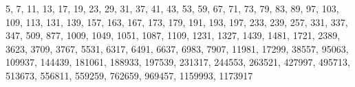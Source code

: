 5, 7, 11, 13, 17, 19, 23, 29, 31, 37, 41, 43, 53, 59, 67, 71, 73, 79, 83, 89, 97, 103, 109, 113, 131, 139, 157, 163, 167, 173, 179, 191, 193, 197, 233, 239, 257, 331, 337, 347, 509, 877, 1009, 1049, 1051, 1087, 1109, 1231, 1327, 1439, 1481, 1721, 2389, 3623, 3709, 3767, 5531, 6317, 6491, 6637, 6983, 7907, 11981, 17299, 38557, 95063, 109937, 144439, 181061, 188933, 197539, 231317, 244553, 263521, 427997, 495713, 513673, 556811, 559259, 762659, 969457, 1159993, 1173917